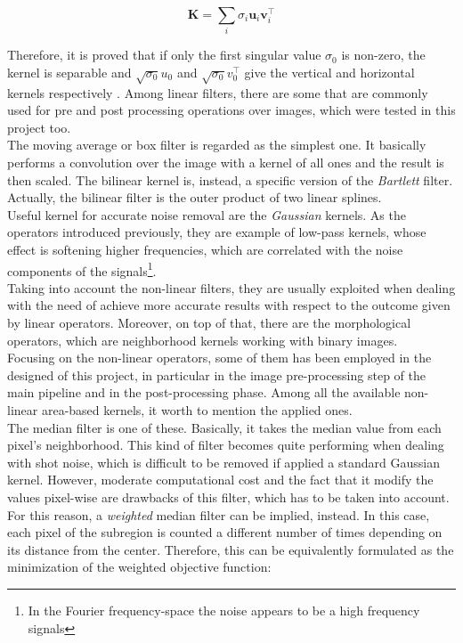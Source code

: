 \begin{equation}
	\label{eqn:svd-check-separable}	
	\mathbf{K} = \sum_{i} \sigma_i \mathbf{u}_i \mathbf{v}_i^\top
\end{equation}

Therefore, it is proved that if only the first singular value $\sigma_0$ is non-zero, the kernel is separable and $\sqrt{\sigma_0}u_0$ and $\sqrt{\sigma_0}v_0^\top$ give the vertical and horizontal kernels respectively \cite{Szeliski2011}.
Among linear filters, there are some that are commonly used for pre and post processing operations over images, which were tested in this project too.\\
The moving average or box filter is regarded as the simplest one. 
It basically performs a convolution over the image with a kernel of all ones and the result is then scaled. 
The bilinear kernel is, instead, a specific version of the \textit{Bartlett} filter. 
Actually, the bilinear filter is the outer product of two linear splines.\\
Useful kernel for accurate noise removal are the \textit{Gaussian} kernels.
As the operators introduced previously, they are example of low-pass kernels, whose effect is softening higher frequencies, which are correlated with the noise components of the signals\footnote{In the Fourier frequency-space the noise appears to be a high frequency signals}. \\
Taking into account the non-linear filters, they are usually exploited when dealing with the need of achieve more accurate results with respect to the outcome given by linear operators.
Moreover, on top of that, there are the morphological operators, which are neighborhood kernels working with binary images.\\
Focusing on the non-linear operators, some of them has been employed in the designed of this project, in particular in the image pre-processing step of the main pipeline and in the post-processing phase.
Among all the available non-linear area-based kernels, it worth to mention the applied ones.\\
The median filter is one of these. 
Basically, it takes the median value from each pixel's neighborhood.
This kind of filter becomes quite performing when dealing with shot noise, which is difficult to be removed if applied a standard Gaussian kernel.
However, moderate computational cost and the fact that it modify the values pixel-wise are drawbacks of this filter, which has to be taken into account.
For this reason, a \textit{weighted} median filter can be implied, instead. 
In this case, each pixel of the subregion is counted a different number of times depending on its distance from the center.
Therefore, this can be equivalently formulated as the minimization of the weighted objective function:

